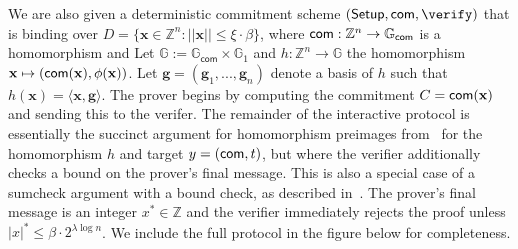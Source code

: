 We are also given a deterministic commitment scheme $(\setup, \com, \verify)$ that is binding over $D = \{ \mathbf{x} \in \mathbb{Z}^n: ||\mathbf{x}|| \leq \xi \cdot \beta\}$, where $\mathsf{com}: \mathbb{Z}^n \rightarrow \mathbb{G}_\textsf{com}$ is a homomorphism and 
Let $\mathbb{G} := \mathbb{G}_\textsf{com} \times \mathbb{G}_1$ and $h: \mathbb{Z}^n \rightarrow \mathbb{G}$ the homomorphism $\mathbf{x} \mapsto (\mathsf{com}(\mathbf{x}), \phi(\mathbf{x}))$. Let $\mathbf{g} = (\mathbf{g}_1,...,\mathbf{g}_n)$ denote a basis of $h$ such that $h(\mathbf{x}) = \langle \mathbf{x}, \mathbf{g} \rangle$. The prover begins by computing the commitment $C = \mathsf{com}(\mathbf{x})$ and sending this to the verifer. The remainder of the interactive protocol is essentially the succinct argument for homomorphism preimages from~\cite{C:BDFG21,C:AttCra20} for the homomorphism $h$ and target $y = (\mathsf{com}, t)$, but where the verifier additionally checks a bound on the prover's final message. This is also a special case of a sumcheck argument with a bound check, as described in~\cite{C:BooChiSot21}. The prover's final message is an integer $x^* \in \mathbb{Z}$ and the verifier immediately rejects the proof unless $|x|^* \leq \beta \cdot 2^{\lambda \log n}$. We include the full protocol in the figure below for completeness. 

\newcommand{\g}{\mathbf{g}}
\newcommand{\x}{\mathbf{x}}
\newcommand{\G}{\mathbb{G}}
\newcommand{\Z}{\mathbb{Z}}
\newcommand{\FlowRight}[2][75pt]{%
  \xrightarrow{\text{\normalsize\hbox to #1{\hfill \(#2\) \hfill}}}
}
\newcommand{\FlowLeft}[2][75pt]{%
  \xleftarrow{\text{\normalsize\hbox to #1{\hfill \(#2\) \hfill}}}
}
\newcommand{\FlowLeftRight}[2][100pt]{%
  \xleftrightarrow{\text{\normalsize\hbox to #1{\hfill \(#2\) \hfill}}}
}


